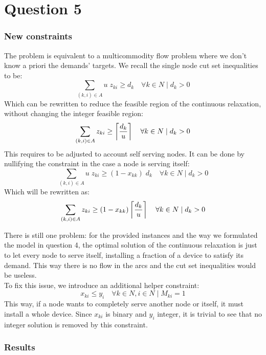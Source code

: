 \section{Question 5}

\subsubsection*{New constraints}

The problem is equivalent to a multicommodity flow problem where we don't know a priori the demands' targets. We recall the single node cut set inequalities to be:
$$
\sum_{(k, i) \in A} u \; z_{ki} \geq d_k \quad \forall k \in N \mid d_k > 0
$$
Which can be rewritten to reduce the feasible region of the continuous relaxation, without changing the integer feasible region:
$$
\sum_{(k, i) \in A} z_{ki} \geq \left \lceil {d_k \over u} \right \rceil \quad \forall k \in N \mid d_k > 0
$$
This requires to be adjusted to account self serving nodes. It can be done by nullifying the constraint in the case a node is serving itself:
$$
\sum_{(k, i) \in A} u \; z_{ki} \geq (1 - x_{kk}) \; d_k \quad \forall k \in N \mid d_k > 0
$$
Which will be rewritten as:
$$
\sum_{(k, i) \in A} z_{ki} \geq (1 - x_{kk}) \left \lceil {d_k \over u} \right \rceil \quad \forall k \in N \mid d_k > 0
$$

There is still one problem: for the provided instances and the way we formulated the model in question 4, the optimal solution of the continuous relaxation is just to let every node to serve itself, installing a fraction of a device to satisfy its demand. This way there is no flow in the arcs and the cut set inequalities would be useless.  \\

To fix this issue, we introduce an additional helper constraint:
$$
x_{ki} \leq y_i \quad \forall k \in N, i \in N \mid M_{ki} = 1
$$
This way, if a node wants to completely serve another node or itself, it must install a whole device. Since $x_{ki}$ is binary and $y_i$ integer, it is trivial to see that no integer solution is removed by this constraint.

\newpage
\subsubsection*{Results}

